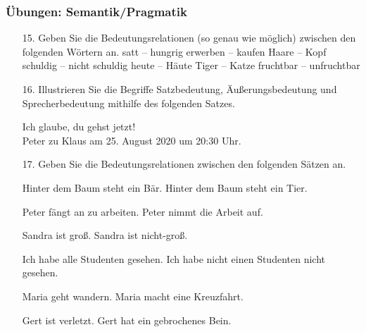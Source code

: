 \begin{frame}
\frametitle{Übungen: Semantik/Pragmatik}

\begin{itemize}
	\item[15.] Geben Sie die Bedeutungsrelationen (so genau wie möglich) zwischen den folgenden Wörtern an.
	\eal
	\ex satt -- hungrig
	\ex erwerben -- kaufen
	\ex Haare -- Kopf
	\ex schuldig -- nicht schuldig
	\ex heute -- Häute
	\ex Tiger -- Katze
	\ex fruchtbar -- unfruchtbar
	\zl
	
	\item[16.] Illustrieren Sie die Begriffe Satzbedeutung, Äußerungsbedeutung und Sprecherbedeutung mithilfe des folgenden Satzes.
	
	\ea Ich glaube, du gehst jetzt! \\
	\ras Peter zu Klaus am 25. August 2020 um 20:30 Uhr.
	\z
	
\end{itemize}

\end{frame}


\begin{frame}

\begin{itemize}
	\item[17.] Geben Sie die Bedeutungsrelationen zwischen den folgenden Sätzen an.
	
	\eal 
	\ex Hinter dem Baum steht ein Bär.
	\ex Hinter dem Baum steht ein Tier.
	\zl
	
	\eal 
	\ex Peter fängt an zu arbeiten.
	\ex Peter nimmt die Arbeit auf.
	\zl
	
	\eal 
	\ex Sandra ist groß.
	\ex Sandra ist nicht-groß.
	\zl
	
	\eal 
	\ex Ich habe alle Studenten gesehen.
	\ex Ich habe nicht einen Studenten nicht gesehen.
	\zl
	
	\eal 
	\ex Maria geht wandern.
	\ex Maria macht eine Kreuzfahrt.
	\zl
	
	\eal 
	\ex Gert ist verletzt.
	\ex Gert hat ein gebrochenes Bein.
	\zl
	
\end{itemize}

\end{frame}


